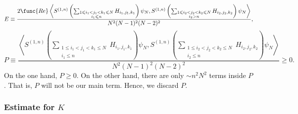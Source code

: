 \documentclass[12pt,letterpaper,leqno]{amsart}
\theoremstyle{plain}
\numberwithin{equation}{section}
\numberwithin{theorem}{section}
\numberwithin{proposition}{section}
\numberwithin{lemma}{section}
\numberwithin{corollary}{section}
\begin{document}
\begin{equation*}
E\equiv \frac{2\func{Re}\left\langle S^{(1,n)}\left( \sum_{\substack{ %
1\leqslant i_{1}<j_{1}<k_{1}\leqslant N  \\ i_{1}\leqslant n}}%
H_{i_{1},j_{1},k_{1}}\right) \psi _{N},S^{(1,n)}\left( \sum_{\substack{ %
1\leqslant i_{2}<j_{2}<k_{2}\leqslant N  \\ i_{2}>n}}H_{i_{2},j_{2},k_{2}}%
\right) \psi _{N}\right\rangle }{N^{2}(N-1)^{2}(N-2)^{2}},
\end{equation*}%
\begin{equation*}
P\equiv \frac{\left\langle S^{(1,n)}\left( \sum_{\substack{ 1\leqslant
i_{1}<j_{1}<k_{1}\leqslant N  \\ i_{1}\leqslant n}}H_{i_{1},j_{1},k_{1}}%
\right) \psi _{N},S^{(1,n)}\left( \sum_{\substack{ 1\leqslant
i_{2}<j_{2}<k_{2}\leqslant N  \\ i_{2}\leqslant n}}H_{i_{2},j_{2},k_{2}}%
\right) \psi _{N}\right\rangle }{N^{2}(N-1)^{2}(N-2)^{2}}\geqslant 0.
\end{equation*}%
On the one hand, $P\geqslant 0$. On the other hand, there are only $\sim
n^{2}N^{2}$ terms inside $P$. That is, $P$ will not be our main term. Hence,
we discard $P$.

\subsubsection{Estimate for $K$}
\end{document}
